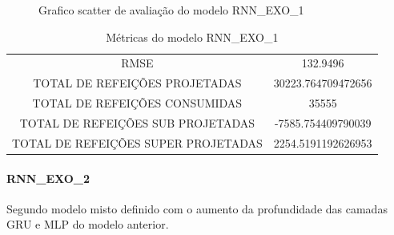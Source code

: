 \documentclass[	12pt, Times, openright, twoside, a4paper, english, brazil]{abntex2}
\begin{document}
{\begin{center}
\begin{minipage}[c]{0.45\textwidth}
\begin{figure}[H]
{                    \caption{Grafico scatter de avaliação do modelo RNN\_EXO\_1} \label{fig:case1_rnn_exo_1_val_scatter} }
                \end{figure}
                \end{minipage} \end{center} }
               
                
                \begin{table}[!ht]
                \centering
                \caption{Métricas do modelo  RNN\_EXO\_1 }
                \begin{tabular}{|c|c|}
                \rowcolor{gray!50}
                \hline
                \multicolumn{2}{c}{METRICAS DO MODELO RNN\_EXO\_1 :}\\ \hline
                RMSE & 132.9496\\
                TOTAL DE REFEIÇÕES PROJETADAS & 30223.764709472656\\
                TOTAL DE REFEIÇÕES CONSUMIDAS & 35555\\
                TOTAL DE REFEIÇÕES SUB PROJETADAS & -7585.754409790039\\
                TOTAL DE REFEIÇÕES SUPER PROJETADAS & 2254.5191192626953\\
                \hline \end{tabular} \end{table}
                
              \paragraph{RNN\_EXO\_2} Segundo modelo misto definido com o aumento da profundidade das camadas GRU e MLP do modelo anterior.
                \begin{figure}[H]
                \end{figure}
                
\end{document}

